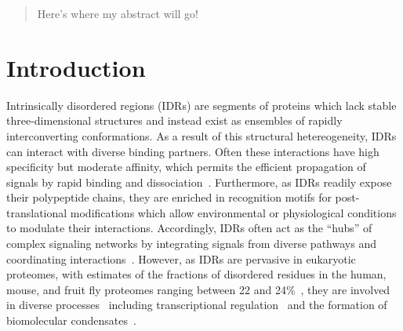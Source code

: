 \begin{abstract}
\noindent
Here's where my abstract will go!
\end{abstract}

\section{Introduction}
Intrinsically disordered regions (IDRs) are segments of proteins which lack stable three-dimensional structures and instead exist as ensembles of rapidly interconverting conformations. As a result of this structural hetereogeneity, IDRs can interact with diverse binding partners. Often these interactions have high specificity but moderate affinity, which permits the efficient propagation of signals by rapid binding and dissociation~\cite{Zhou2012, Wright2014}. Furthermore, as IDRs readily expose their polypeptide chains, they are enriched in recognition motifs for post-translational modifications which allow environmental or physiological conditions to modulate their interactions. Accordingly, IDRs often act as the ``hubs'' of complex signaling networks by integrating signals from diverse pathways and coordinating interactions~\cite{Dunker2005, Buljan2012}. However, as IDRs are pervasive in eukaryotic proteomes, with estimates of the fractions of disordered residues in the human, mouse, and fruit fly proteomes ranging between 22 and 24\%~\cite{Piovesan2020, Piovesan2022}, they are involved in diverse processes~\cite{vanderLee2014} including transcriptional regulation~\cite{Liu2006} and the formation of biomolecular condensates~\cite{Banani2017}.

